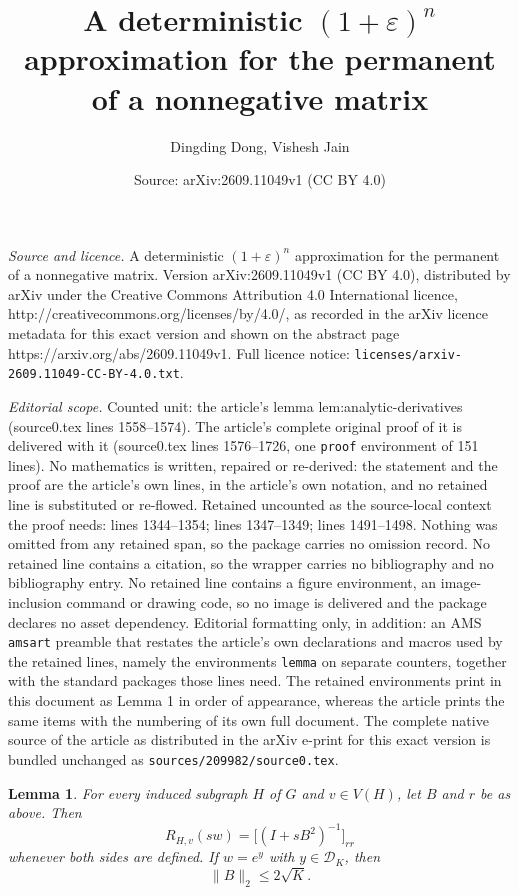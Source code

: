 \documentclass[10pt,a4paper]{amsart}
\title{A deterministic $(1+\varepsilon)^n$ approximation for the permanent of a nonnegative matrix}
\author{Dingding Dong, Vishesh Jain}
\date{Source: arXiv:2609.11049v1 (CC BY 4.0)}
\newtheorem{lemma}{Lemma}
\newcommand{\cD}{\mathcal D}
\newcommand{\norm}[1]{\lVert #1\rVert}
\begin{document}
\maketitle

\noindent\emph{Source and licence.} A deterministic $(1+\varepsilon)^n$ approximation for the permanent of a nonnegative matrix. Version arXiv:2609.11049v1 (CC BY 4.0), distributed by arXiv under the Creative Commons Attribution 4.0 International licence, http://creativecommons.org/licenses/by/4.0/, as recorded in the arXiv licence metadata for this exact version and shown on the abstract page https://arxiv.org/abs/2609.11049v1. Full licence notice: \texttt{licenses/arxiv-2609.11049-CC-BY-4.0.txt}.\par\smallskip

\noindent\textit{Editorial scope.} Counted unit: the article's lemma lem:analytic-derivatives (source0.tex lines 1558--1574). The article's complete original proof of it is delivered with it (source0.tex lines 1576--1726, one \texttt{proof} environment of 151 lines). No mathematics is written, repaired or re-derived: the statement and the proof are the article's own lines, in the article's own notation, and no retained line is substituted or re-flowed.  Retained uncounted as the source-local context the proof needs: lines 1344--1354; lines 1347--1349; lines 1491--1498.  Nothing was omitted from any retained span, so the package carries no omission record.  No retained line contains a citation, so the wrapper carries no bibliography and no bibliography entry.  No retained line contains a figure environment, an image-inclusion command or drawing code, so no image is delivered and the package declares no asset dependency.  Editorial formatting only, in addition: an AMS \texttt{amsart} preamble that restates the article's own declarations and macros used by the retained lines, namely the environments \texttt{lemma} on separate counters, together with the standard packages those lines need.  The retained environments print in this document as Lemma 1 in order of appearance, whereas the article prints the same items with the numbering of its own full document.  The complete native source of the article as distributed in the arXiv e-print for this exact version is bundled unchanged as \texttt{sources/209982/source0.tex}.
\begin{lemma}\label{lem:path-tree-resolvent}
For every induced subgraph $H$ of $G$ and $v\in V(H)$, let $B$ and
$r$ be as above. Then
\begin{equation}\label{eq:path-tree-resolvent}
 R_{H,v}(sw)=\bigl[(I+sB^2)^{-1}\bigr]_{rr}
\end{equation}
whenever both sides are defined. If $w=e^y$ with $y\in\cD_K$, then
\begin{equation*}
 \norm{B}_2\le2\sqrt K.
\end{equation*}
\end{lemma}
\end{document}
